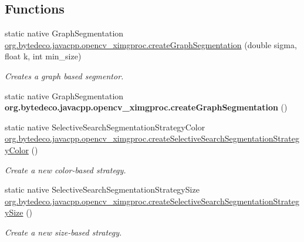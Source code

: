 \subsection*{Functions}
\begin{DoxyCompactItemize}
\item 
static native Graph\+Segmentation \hyperlink{group__ximgproc__segmentation_ga51469520253d4dc38fd411763692c452}{org.\+bytedeco.\+javacpp.\+opencv\+\_\+ximgproc.\+create\+Graph\+Segmentation} (double sigma, float k, int min\+\_\+size)
\begin{DoxyCompactList}\small\item\em Creates a graph based segmentor. \end{DoxyCompactList}\item 
\mbox{\label{group__ximgproc__segmentation_gad21abb67ff1c88ecbae338efd15ae526}} 
static native Graph\+Segmentation {\bfseries org.\+bytedeco.\+javacpp.\+opencv\+\_\+ximgproc.\+create\+Graph\+Segmentation} ()
\item 
\mbox{\label{group__ximgproc__segmentation_ga9631bc8096ead6133e098623d8f1e664}} 
static native Selective\+Search\+Segmentation\+Strategy\+Color \hyperlink{group__ximgproc__segmentation_ga9631bc8096ead6133e098623d8f1e664}{org.\+bytedeco.\+javacpp.\+opencv\+\_\+ximgproc.\+create\+Selective\+Search\+Segmentation\+Strategy\+Color} ()
\begin{DoxyCompactList}\small\item\em Create a new color-\/based strategy. \end{DoxyCompactList}\item 
\mbox{\label{group__ximgproc__segmentation_gabe5aa072443fd8b40ea54141bd3628b7}} 
static native Selective\+Search\+Segmentation\+Strategy\+Size \hyperlink{group__ximgproc__segmentation_gabe5aa072443fd8b40ea54141bd3628b7}{org.\+bytedeco.\+javacpp.\+opencv\+\_\+ximgproc.\+create\+Selective\+Search\+Segmentation\+Strategy\+Size} ()
\begin{DoxyCompactList}\small\item\em Create a new size-\/based strategy. \end{DoxyCompactList}\item 
\mbox{\label{group__ximgproc__segmentation_ga921f1030601ebcdad67662f016ebb6bf}} 

\end{DoxyCompactItemize}
